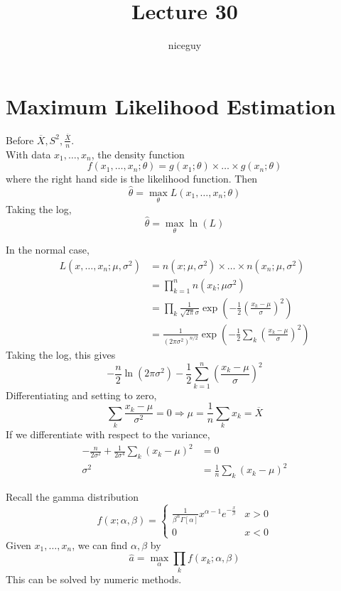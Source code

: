 \documentclass[12pt]{article}
\author{niceguy}
\title{Lecture 30}
\begin{document}
\maketitle

\section{Maximum Likelihood Estimation}

Before $\overline X, S^2, \frac{\overline X}{n}$. \\
With data $x_1,\dots,x_n$, the density function
$$f(x_1,\dots,x_n;\theta) = g(x_1;\theta) \times \dots \times g(x_n;\theta)$$
where the right hand side is the likelihood function. Then
$$\hat \theta = \max_\theta L(x_1,\dots,x_n;\theta)$$
Taking the log,
$$\hat \theta = \max_\theta \ln(L)$$

\begin{ex}
    In the normal case,
    \begin{align*}
        L(x,\dots,x_n;\mu,\sigma^2) &= n(x;\mu,\sigma^2) \times \dots \times n(x_n;\mu,\sigma^2) \\
                                    &= \prod_{k=1}^n n(x_k;\mu\sigma^2) \\
                                    &= \prod_k \frac{1}{\sqrt{2\pi}\sigma}\exp\left(-\frac{1}{2}\left(\frac{x_k-\mu}{\sigma}\right)^2\right) \\
                                    &= \frac{1}{(2\pi\sigma^2)^{n/2}} \exp\left(-\frac{1}{2}\sum_k \left(\frac{x_k-\mu}{\sigma}\right)^2\right)
    \end{align*}
    Taking the log, this gives
    $$-\frac{n}{2}\ln(2\pi\sigma^2) - \frac{1}{2} \sum_{k=1}^n \left(\frac{x_k-\mu}{\sigma}\right)^2$$
    Differentiating and setting to zero, 
    $$\sum_k \frac{x_k-\mu}{\sigma^2} = 0 \Rightarrow \mu = \frac{1}{n}\sum_k x_k = \overline X$$
    If we differentiate with respect to the variance,
    \begin{align*}
        -\frac{n}{2\sigma^2} + \frac{1}{2\sigma^4}\sum_k (x_k-\mu)^2 &= 0 \\
        \sigma^2 &= \frac{1}{n} \sum_k (x_k-\mu)^2
    \end{align*}
\end{ex}

\begin{ex}
    Recall the gamma distribution
    $$f(x;\alpha,\beta) = \begin{cases} \frac{1}{\beta^\alpha\Gamma[\alpha]} x^{\alpha-1}e^{-\frac{x}{\beta}} & x > 0 \\ 0 & x < 0 \end{cases}$$
    Given $x_1,\dots,x_n$, we can find $\alpha,\beta$ by
    $$\hat a = \max_\alpha \prod_k f(x_k;\alpha,\beta)$$
    This can be solved by numeric methods.
\end{ex}
\end{document}
